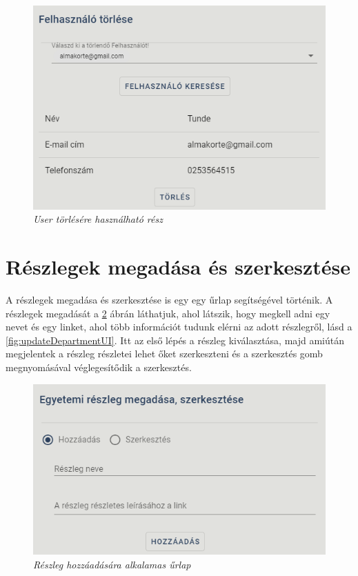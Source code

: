 \begin{figure}[H]
	\centering
	\includegraphics[width=0.7\linewidth]{figures/images/userTorlese.png}
	\caption[User törlésére használható rész]{\textit{User törlésére használható rész}}
	\label{fig:deleteUser}
\end{figure}

\section{Részlegek megadása és szerkesztése}

A részlegek megadása és szerkesztése is egy egy űrlap segítségével történik. A részlegek megadását a \ref{fig:addDepartmentUI} ábrán láthatjuk, ahol látszik, hogy megkell adni egy nevet és egy linket, ahol több információt tudunk elérni az adott részlegről, lásd a \ref{fig:updateDepartmentUI}. Itt az első lépés a részleg kiválasztása, majd amiútán megjelentek a részleg részletei lehet őket szerkeszteni és a szerkesztés gomb megnyomásával véglegesítődik a szerkesztés.
\begin{figure}[H]
	\centering
	\includegraphics[width=0.7\linewidth]{figures/images/reszlegHozzaadas.png}
	\caption[Részleg hozzáadására alkalamas űrlap]{\textit{Részleg hozzáadására alkalamas űrlap}}
	\label{fig:addDepartmentUI}
\end{figure}


